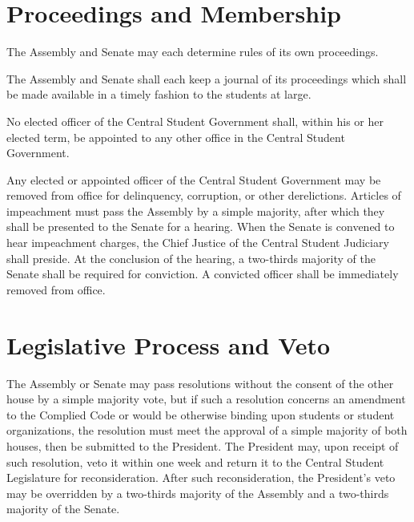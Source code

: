 \section{Proceedings and Membership}
    The Assembly and Senate may each determine rules of its own proceedings.

    The Assembly and Senate shall each keep a journal of its proceedings which shall be made available in a timely fashion to the students at large.

    No elected officer of the Central Student Government shall, within his or her elected term, be appointed to any other office in the Central Student Government.

    Any elected or appointed officer of the Central Student Government may be removed from office for delinquency, corruption, or other derelictions. Articles of impeachment must pass the Assembly by a simple majority, after which they shall be presented to the Senate for a hearing. When the Senate is convened to hear impeachment charges, the Chief Justice of the Central Student Judiciary shall preside. At the conclusion of the hearing, a two-thirds majority of the Senate shall be required for conviction. A convicted officer shall be immediately removed from office.


\section{Legislative Process and Veto}
    The Assembly or Senate may pass resolutions without the consent of the other house by a simple majority vote, but if such a resolution concerns an amendment to the Complied Code or would be otherwise binding upon students or student organizations, the resolution must meet the approval of a simple majority of both houses, then be submitted to the President. The President may, upon receipt of such resolution, veto it within one week and return it to the Central Student Legislature for reconsideration. After such reconsideration, the President's veto may be overridden by a two-thirds majority of the Assembly and a two-thirds majority of the Senate.

